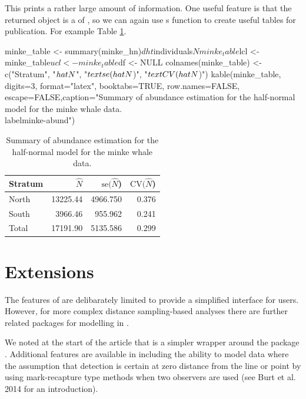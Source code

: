 \documentclass[article]{jss}
\begin{document}
This prints a rather large amount of information. One useful feature is
that the returned object is a  of , so we
can again use s  function to create useful tables
for publication. For example Table \ref{minke-abund}.

\begin{CodeChunk}
\begin{CodeInput}
minke_table <- summary(minke_hn)$dht$individuals$N
minke_table$lcl <- minke_table$ucl <- minke_table$df <- NULL
colnames(minke_table) <- c("Stratum", "$\\hat{N}$", "$\\text{se}(\\hat{N}$)", 
                           "$\\text{CV}(\\hat{N}$)")
kable(minke_table, digits=3, format="latex", booktabs=TRUE,
      row.names=FALSE, escape=FALSE,caption="Summary of abundance estimation for the half-normal model for the minke whale data.\\label{minke-abund}")
\end{CodeInput}
\begin{table}

\caption{Summary of abundance estimation for the half-normal model for the minke whale data.\label{minke-abund}}
\begin{tabular}{lrrr}
\toprule
Stratum & $\hat{N}$ & $\text{se}(\hat{N}$) & $\text{CV}(\hat{N}$)\\
\midrule
North & 13225.44 & 4966.750 & 0.376\\
South & 3966.46 & 955.962 & 0.241\\
Total & 17191.90 & 5135.586 & 0.299\\
\bottomrule
\end{tabular}
\end{table}

\end{CodeChunk}

\section{Extensions}\label{extensions}

The features of  are delibarately limited to provide a
simplified interface for users. However, for more complex distance
sampling-based analyses there are further related packages for modelling
in .

We noted at the start of the article that  is a simpler
wrapper around the package . Additional features are available
in  including the ability to model data where the assumption
that detection is certain at zero distance from the line or point by
using mark-recapture type methods when two observers are used (see Burt
et al. 2014 for an introduction).
\end{document}

